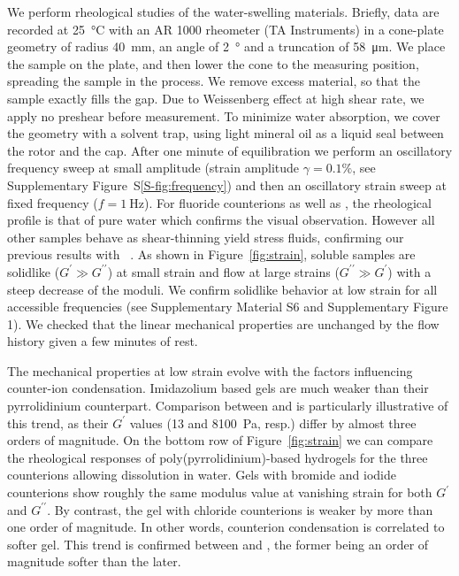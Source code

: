 \documentclass[twoside,twocolumn,9pt]{article}
\begin{document}
We perform rheological studies of the water-swelling materials. Briefly, data are recorded at \SI{25}{\celsius} with an AR 1000 rheometer (TA Instruments) in a cone-plate geometry of radius \SI{40}{\milli\metre}, an angle of \SI{2}{\degree} and a truncation of \SI{58}{\micro\metre}\cite{Macosko1994,Larson1999}. We place the sample on the plate, and then lower the cone to the measuring position, spreading the sample in the process. We remove excess material, so that the sample exactly fills the gap. Due to Weissenberg effect at high shear rate, we apply no preshear before measurement. To minimize water absorption, we cover the geometry with a solvent trap, using light mineral oil as a liquid seal between the rotor and the cap. After one minute of equilibration we perform an oscillatory frequency sweep at small amplitude (strain amplitude $\gamma=0.1\%$, see Supplementary Figure~S\ref{S-fig:frequency}) and then an oscillatory strain sweep at fixed frequency ($f=\SI{1}{\hertz}$). For fluoride counterions as well as , the rheological profile is that of pure water which confirms the visual observation. However all other samples behave as shear-thinning yield stress fluids, confirming our previous results with ~\cite{Srour2014}. As shown in Figure~\ref{fig:strain}, soluble samples are solidlike ($G^\prime \gg G^{\prime\prime}$) at small strain and flow at large strains ($G^{\prime\prime} \gg G^\prime$) with a steep decrease of the moduli. We confirm solidlike behavior at low strain for all accessible frequencies (see Supplementary Material S6 and Supplementary Figure 1). We checked that the linear mechanical properties are unchanged by the flow history given a few minutes of rest.

The mechanical properties at low strain evolve with the factors influencing counter-ion condensation. Imidazolium based gels are much weaker than their pyrrolidinium counterpart. Comparison between  and  is particularly illustrative of this trend, as their $G^\prime$ values (13 and \SI{8100}{\pascal}, resp.) differ by almost three orders of magnitude. On the bottom row of Figure~\ref{fig:strain} we can compare the rheological responses of poly(pyrrolidinium)-based hydrogels for the three counterions allowing dissolution in water. Gels with bromide and iodide counterions show roughly the same modulus value at vanishing strain for both $G^\prime$ and $G^{\prime\prime}$. By contrast, the gel with chloride counterions is weaker by more than one order of magnitude. In other words, counterion condensation is correlated to softer gel. This trend is confirmed between  and , the former being an order of magnitude softer than the later.
\end{document}
